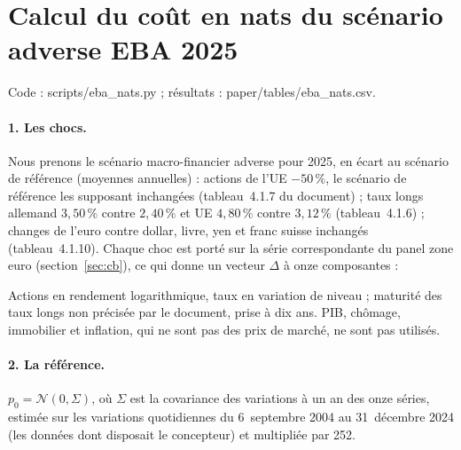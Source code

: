 \documentclass[11pt]{article}
\theoremstyle{definition}
\begin{document}
\section{Calcul du coût en nats du scénario adverse EBA 2025}
\label{app:eba}

Code : scripts/eba\_nats.py ; résultats : paper/tables/eba\_nats.csv.

\paragraph{1. Les chocs.} Nous prenons le scénario macro-financier adverse
\citep{eba2025} pour 2025, en écart au scénario de référence (moyennes
annuelles) : actions de l'UE $-50\,\%$, le scénario de référence les
supposant inchangées (tableau~4.1.7 du document) ; taux longs allemand
$3{,}50\,\%$ contre $2{,}40\,\%$ et UE $4{,}80\,\%$ contre $3{,}12\,\%$
(tableau~4.1.6) ; changes de l'euro contre dollar, livre, yen et franc suisse
inchangés (tableau~4.1.10). Chaque choc est porté sur la série correspondante
du panel zone euro (section~\ref{sec:cb}), ce qui donne un vecteur $\Delta$ à
onze composantes :
\begin{center}
\small
{}
\end{center}
Actions en rendement logarithmique, taux en variation de niveau ; maturité
des taux longs non précisée par le document, prise à dix ans. PIB, chômage,
immobilier et inflation, qui ne sont pas des prix de marché, ne sont pas
utilisés.

\paragraph{2. La référence.} $p_0=\mathcal N(0,\Sigma)$, où $\Sigma$ est la
covariance des variations à un an des onze séries, estimée sur les variations
quotidiennes du 6~septembre 2004 au 31~décembre 2024 (les données dont
disposait le concepteur) et multipliée par 252.
\end{document}
